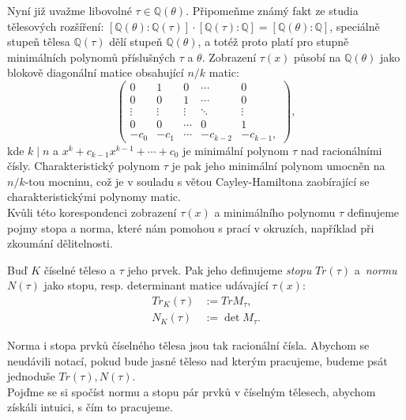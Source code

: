 \documentclass [12pt]{report}
\begin{document}
Nyní již uvažme libovolné $ \tau \in \mathbb{Q}(\theta)$. Připomeňme známý fakt ze studia tělesových rozšíření: $[\mathbb{Q}(\theta) : \mathbb{Q}(\tau)] \cdot [\mathbb{Q}(\tau) : \mathbb{Q}] = [\mathbb{Q}(\theta) : \mathbb{Q}]$, speciálně stupeň tělesa $\mathbb{Q}(\tau)$ dělí stupeň $\mathbb{Q}(\theta)$, a totéž proto platí pro stupně minimálních polynomů příslušných $\tau$ a $\theta$. Zobrazení $\tau(x)$ působí na $\mathbb{Q}(\theta)$ jako blokově diagonální matice obsahující $n/k$ matic:
\begin{equation*}
 \begin{pmatrix}
0 & 1 & 0 & \cdots & 0\\
0 & 0 & 1 & \cdots & 0\\
\vdots & \vdots & \vdots & \ddots &\vdots\\
0 & 0 & \cdots & 0& 1\\
-c_0 & -c_1 & \cdots & -c_{k-2} & -c_{k-1},
\end{pmatrix},
\end{equation*}
kde $k \mid n$ a $x^k + c_{k-1} x^{k-1} + \cdots  + c_0$ je minimální polynom $\tau$ nad racionálními čísly. Charakteristický polynom $\tau$ je pak jeho minimální polynom umocněn na $n/k$-tou mocninu, což je v souladu s větou Cayley-Hamiltona zaobírající se charakteristickými polynomy matic.\\

Kvůli této korespondenci zobrazení $\tau(x)$ a minimálního polynomu $\tau$ definujeme pojmy stopa a norma, které nám pomohou s prací v okruzích, například při zkoumání dělitelnosti.

\begin{definice}
Buď $K$ číselné těleso a $\tau$ jeho prvek. Pak jeho definujeme \textit{stopu} $Tr(\tau)$ a~\textit{normu} $N(\tau)$ jako stopu, resp. determinant matice udávající $\tau(x)$:
\begin{align*}
Tr_K(\tau) &:= Tr M_\tau,\\
N_K(\tau) &:= \det M_{\tau}.
\end{align*} 
\end{definice}

Norma i stopa prvků číselného tělesa jsou tak racionální čísla. Abychom se neudávili notací, pokud bude jasné těleso nad kterým pracujeme, budeme psát jednoduše $Tr(\tau),N(\tau)$.\\

Pojďme se si spočíst normu a stopu pár prvků v číselným tělesech, abychom získáli intuici, s čím to pracujeme.\\
\end{document}
